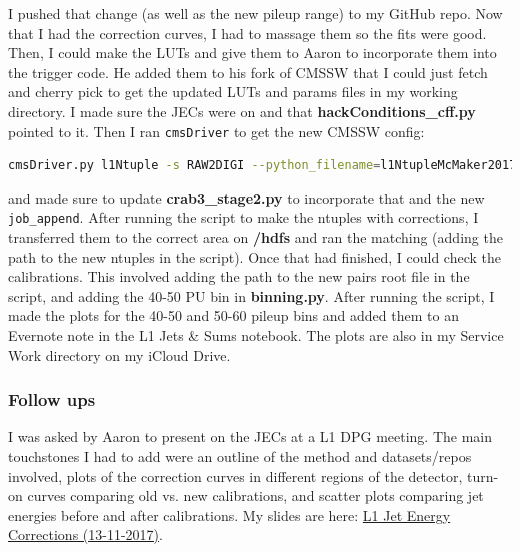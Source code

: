 I pushed that change (as well as the new pileup range) to my GitHub repo. Now that I had the correction curves, I had to massage them so the fits were good. Then, I could make the LUTs and give them to Aaron to incorporate them into the trigger code. He added them to his fork of CMSSW that I could just fetch and cherry pick to get the updated LUTs and params files in my working directory. I made sure the JECs were on and that \textbf{hackConditions\_cff.py} pointed to it. Then I ran \texttt{cmsDriver} to get the new CMSSW config:

\begin{lstlisting}[belowskip=-0.7cm, language=sh, numbers=none]
cmsDriver.py l1Ntuple -s RAW2DIGI --python_filename=l1NtupleMcMaker2017_RAW2DIGI_v3_closureTest.py -n 420 --no_output --era=Run2_2017 --mc --conditions=92X_upgrade2017_realistic_v7 --customise=L1Trigger/Configuration/customiseReEmul.L1TReEmulMCFrom90xRAWSimHcalTP --customise=L1Trigger/L1TNtuples/customiseL1Ntuple.L1NtupleRAWEMUGEN_MC --customise=L1Trigger/Configuration/customiseSettings.L1TSettingsToCaloStage2Params_2017_v1_10_mode_inconsistent --filein=/store/mc/RunIISummer17DRStdmix/QCD_Pt-15to3000_TuneCUETP8M1_Flat_13TeV_pythia8/GEN-SIM-RAW/NZSFlatPU28to62_92X_upgrade2017_realistic_v10-v1/10000/00052042-ED9E-E711-A959-FA163E22945C.root
\end{lstlisting}

and made sure to update \textbf{crab3\_stage2.py} to incorporate that and the new \texttt{job\_append}. After running the script to make the ntuples with corrections, I transferred them to the correct area on \textbf{/hdfs} and ran the matching (adding the path to the new ntuples in the script). Once that had finished, I could check the calibrations. This involved adding the path to the new pairs root file in the script, and adding the 40-50 PU bin in \textbf{binning.py}. After running the script, I made the plots for the 40-50 and 50-60 pileup bins and added them to an Evernote note in the L1 Jets \& Sums notebook. The plots are also in my Service Work directory on my iCloud Drive.


\subsubsection{Follow ups}

I was asked by Aaron to present on the JECs at a L1 DPG meeting. The main touchstones I had to add were an outline of the method and datasets/repos involved, plots of the correction curves in different regions of the detector, turn-on curves comparing old vs. new calibrations, and scatter plots comparing jet energies before and after calibrations. My slides are here: \href{run:./sec20/20171113 L1 Jet Energy Corrections.pdf}{L1 Jet Energy Corrections (13-11-2017)}.

